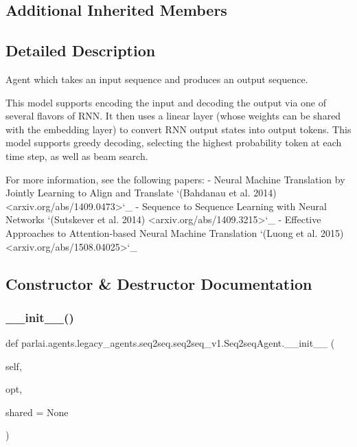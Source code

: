 \subsection*{Additional Inherited Members}


\subsection{Detailed Description}
\begin{DoxyVerb}Agent which takes an input sequence and produces an output sequence.

This model supports encoding the input and decoding the output via one of
several flavors of RNN. It then uses a linear layer (whose weights can
be shared with the embedding layer) to convert RNN output states into
output tokens. This model supports greedy decoding, selecting the
highest probability token at each time step, as well as beam
search.

For more information, see the following papers:
- Neural Machine Translation by Jointly Learning to Align and Translate
  `(Bahdanau et al. 2014) <arxiv.org/abs/1409.0473>`_
- Sequence to Sequence Learning with Neural Networks
  `(Sutskever et al. 2014) <arxiv.org/abs/1409.3215>`_
- Effective Approaches to Attention-based Neural Machine Translation
  `(Luong et al. 2015) <arxiv.org/abs/1508.04025>`_
\end{DoxyVerb}
 

\subsection{Constructor \& Destructor Documentation}
\mbox{\label{classparlai_1_1agents_1_1legacy__agents_1_1seq2seq_1_1seq2seq__v1_1_1Seq2seqAgent_aea5753e8b1090fc88e657ada44492556}} 
\subsubsection{\texorpdfstring{\+\_\+\+\_\+init\+\_\+\+\_\+()}{\_\_init\_\_()}}
{\footnotesize\ttfamily def parlai.\+agents.\+legacy\+\_\+agents.\+seq2seq.\+seq2seq\+\_\+v1.\+Seq2seq\+Agent.\+\_\+\+\_\+init\+\_\+\+\_\+ (\begin{DoxyParamCaption}\item[{}]{self,  }\item[{}]{opt,  }\item[{}]{shared = {\ttfamily None} }\end{DoxyParamCaption})}

